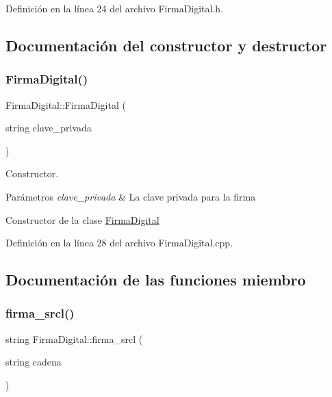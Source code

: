 Definición en la línea 24 del archivo Firma\+Digital.\+h.



\subsection{Documentación del constructor y destructor}
\hypertarget{classFirmaDigital_a327b0fa8329a7e33cc04f8d4793652be}{}\label{classFirmaDigital_a327b0fa8329a7e33cc04f8d4793652be} 
\subsubsection{\texorpdfstring{Firma\+Digital()}{FirmaDigital()}}
{\footnotesize\ttfamily Firma\+Digital\+::\+Firma\+Digital (\begin{DoxyParamCaption}\item[{string}]{clave\+\_\+privada }\end{DoxyParamCaption})}



Constructor. 


\begin{DoxyParams}{Parámetros}
{\em clave\+\_\+privada} & La clave privada para la firma\\
\hline
\end{DoxyParams}
Constructor de la clase \hyperlink{classFirmaDigital}{Firma\+Digital} 

Definición en la línea 28 del archivo Firma\+Digital.\+cpp.



\subsection{Documentación de las funciones miembro}
\hypertarget{classFirmaDigital_ac68550394f9f4e0b73e80dc050875325}{}\label{classFirmaDigital_ac68550394f9f4e0b73e80dc050875325} 
\subsubsection{\texorpdfstring{firma\+\_\+srcl()}{firma\_srcl()}}
{\footnotesize\ttfamily string Firma\+Digital\+::firma\+\_\+srcl (\begin{DoxyParamCaption}\item[{string}]{cadena }\end{DoxyParamCaption})}



